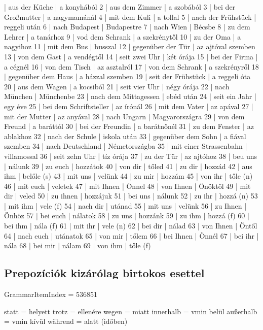 \documentclass{article}
\newenvironment{desc}{\verbatim}{\endverbatim}
\newenvironment{exmp}{\verbatim}{\endverbatim}
\begin{document}
\begin{exmp}
1 | aus der Küche | a konyhából
2 | aus dem Zimmer | a szobából
3 | bei der Großmutter | a nagymamánál
4 | mit dem Kuli | a tollal
5 | nach der Frühstück | reggeli után
6 | nach Budapest | Budapestre
7 | nach Wien | Bécsbe
8 | zu dem Lehrer | a tanárhoz
9 | vod dem Schrank | a szekrénytől
10 | zu der Oma | a nagyihoz
11 | mit dem Bus | busszal
12 | gegenüber der Tür | az ajtóval szemben
13 | von dem Gast | a vendégtől
14 | seit zwei Uhr | két órája
15 | bei der Firma | a cégnél
16 | von dem Tisch | az asztalról
17 | von dem Schrank | a szekrényről
18 | gegenüber dem Haus | a házzal szemben
19 | seit der Frühstück | a reggeli óta
20 | aus dem Wagen | a kocsiból
21 | seit vier Uhr | négy órája
22 | nach München | Münchenbe
23 | nach dem Mittagessen | ebéd után
24 | seit ein Jahr | egy éve
25 | bei dem Schriftsteller | az írónál
26 | mit dem Vater | az apával
27 | mit der Mutter | az anyával
28 | nach Ungarn | Magyarországra
29 | von dem Freund | a baráttól
30 | bei der Freundin | a barátnőnél
31 | zu dem Fenster | az ablakhoz
32 | nach der Schule | iskola után
33 | gegenüber dem Sohn | a fiával szemben
34 | nach Deutschland | Németországba
35 | mit einer Strassenbahn | villamossal
36 | seit zehn Uhr | tíz órája
37 | zu der Tür | az ajtóhoz
38 | beu uns | nálunk
39 | zu euch | hozzátok
40 | von dir | tőled
41 | zu dir | hozzád
42 | aus ihm | belőle (s)
43 | mit uns | velünk
44 | zu mir | hozzám
45 | von ihr | tőle (n)
46 | mit euch | veletek
47 | mit Ihnen | Önnel
48 | von Ihnen | Önöktől
49 | mit dir | veled
50 | zu ihnen | hozzájuk
51 | bei uns | nálunk
52 | zu ihr | hozzá (n)
53 | mit ihm | vele (f)
54 | nach dir | utánad
55 | mit uns | velünk
56 | zu Ihnen | Önhöz
57 | bei euch | nálatok
58 | zu uns | hozzánk
59 | zu ihm | hozzá (f)
60 | bei ihm | nála (f)
61 | mit ihr | vele (n)
62 | bei dir | nálad
63 | von Ihnen | Öntől
64 | nach euch | utánatok
65 | von mir | tőlem
66 | bei Ihnen | Önnél
67 | bei ihr | nála
68 | bei mir | nálam
69 | von ihm | tőle (f)
\end{exmp}

\subsection{Prepozíciók kizárólag birtokos esettel}

GrammarItemIndex = 536851

\begin{desc}
\begin{enumerate}
statt = helyett
trotz = ellenére
wegen = miatt
innerhalb = vmin belül
außerhalb = vmin kívül
während = alatt (időben)
\end{enumerate}
\end{desc}
\end{document}

